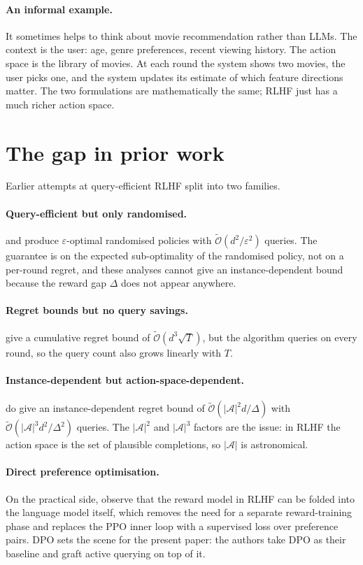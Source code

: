 \documentclass[11pt]{article}
\newcommand{\Otilde}{\tilde{\mathcal{O}}}
\begin{document}
\paragraph{An informal example.}
It sometimes helps to think about movie recommendation rather than LLMs. The context is the user: age, genre preferences, recent viewing history. The action space is the library of movies. At each round the system shows two movies, the user picks one, and the system updates its estimate of which feature directions matter. The two formulations are mathematically the same; RLHF just has a much richer action space.

\section{The gap in prior work}

Earlier attempts at query-efficient RLHF split into two families.

\paragraph{Query-efficient but only randomised.}
\cite{zhan} and \cite{wangPO} produce $\varepsilon$-optimal randomised policies with $\Otilde(d^2 / \varepsilon^2)$ queries. The guarantee is on the expected sub-optimality of the randomised policy, not on a per-round regret, and these analyses cannot give an instance-dependent bound because the reward gap $\Delta$ does not appear anywhere.

\paragraph{Regret bounds but no query savings.}
\cite{wuSun} give a cumulative regret bound of $\Otilde(d^3 \sqrt{T})$, but the algorithm queries on every round, so the query count also grows linearly with $T$.

\paragraph{Instance-dependent but action-space-dependent.}
\cite{sekhari} do give an instance-dependent regret bound of $\Otilde(|\mathcal{A}|^2 d / \Delta)$ with $\Otilde(|\mathcal{A}|^3 d^2 / \Delta^2)$ queries. The $|\mathcal{A}|^2$ and $|\mathcal{A}|^3$ factors are the issue: in RLHF the action space is the set of plausible completions, so $|\mathcal{A}|$ is astronomical.

\paragraph{Direct preference optimisation.}
On the practical side, \cite{rafailov} observe that the reward model in RLHF can be folded into the language model itself, which removes the need for a separate reward-training phase and replaces the PPO inner loop with a supervised loss over preference pairs. DPO sets the scene for the present paper: the authors take DPO as their baseline and graft active querying on top of it.
\end{document}
